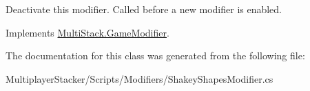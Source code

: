 Deactivate this modifier. Called before a new modifier is enabled. 



Implements \hyperlink{class_multi_stack_1_1_game_modifier_abe04db6ab31f5e5063739d8e5a3f7ad1}{Multi\+Stack.\+Game\+Modifier}.



The documentation for this class was generated from the following file\+:\begin{DoxyCompactItemize}
\item 
Multiplayer\+Stacker/\+Scripts/\+Modifiers/Shakey\+Shapes\+Modifier.\+cs\end{DoxyCompactItemize}
